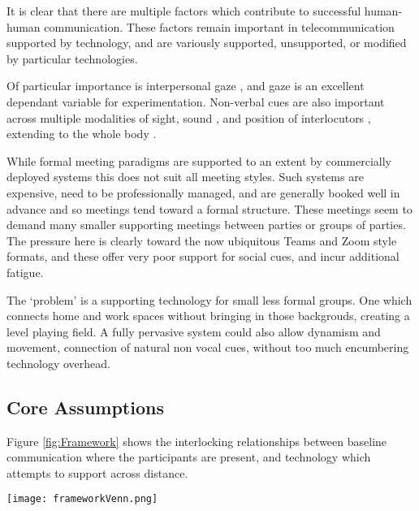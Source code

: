         
            It is clear that there are multiple factors which contribute to successful human-human communication. These factors remain important in telecommunication supported by technology, and are variously supported, unsupported, or modified by particular technologies.\par
            Of particular importance is interpersonal gaze \cite{Cook1977, Kleinke1986, Fagel2010}, and gaze is an excellent dependant variable for experimentation. Non-verbal cues are also important across multiple modalities of sight, sound \cite{Otsuka2005}, and position of interlocutors \cite{Kendon1967}, extending to the whole body \cite{Kleinke1986, Nguyen2009}.\par
            While formal meeting paradigms are supported to an extent by commercially deployed systems this does not suit all meeting styles. Such systems are expensive, need to be professionally managed, and are generally booked well in advance and so meetings tend toward a formal structure. These meetings seem to demand many smaller supporting meetings between parties or groups of parties. The pressure here is clearly toward the now ubiquitous Teams and Zoom style formats, and these offer very poor support for social cues, and incur additional fatigue.\par
The `problem' is a supporting technology for small less formal groups. One which connects home and work spaces without bringing in those backgrouds, creating a level playing field. A fully pervasive system could also allow dynamism and movement, connection of natural non vocal cues, without too much encumbering technology overhead.
            
            \subsection{Core Assumptions}
                Figure \ref{fig:Framework} shows the interlocking relationships between baseline communication where the participants are present, and technology which attempts to support across distance.
                \begin{figure*}[h]
                \centering
                \texttt{[image: frameworkVenn.png]}
                \caption{The Venn diagram shows areas of research which have been identified in blue. These interlock and overlap as shown. The most relevant identified researchers from the literature are shown in black close to the fields of study which they represent. This diagram is a view of the core assumptions for the research, with the most important fields at the centre. }
                \label{fig:Framework}
                \end{figure*}
                
